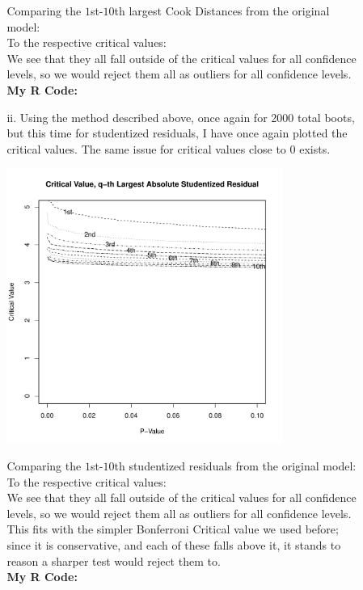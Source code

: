 \documentclass[11pt]{article}
\theoremstyle{definition}
\begin{document}
\begin{itemize}
\begin{itemize}
\begin{itemize}
                        Comparing the $1$st-$10$th largest Cook Distances from the original model:\\ 
                         
                        To the respective critical values: \\
                         
                        We see that they all fall outside of the critical values for all confidence levels, so we would reject them all as outliers for all confidence levels. \\
                        {\bf My R Code:}
                         

                    \item[ii.]
                        Using the method described above, once again for 2000 total boots, but this time for studentized residuals, I have once again plotted the critical values. The same issue for critical values close to 0 exists.
                        \begin{center}
                            \includegraphics[width=9cm]{final/2bii_plot} 
                        \end{center}
                        Comparing the $1$st-$10$th studentized residuals from the original model:\\ 
                         
                        To the respective critical values: \\
                         
                        We see that they all fall outside of the critical values for all confidence levels, so we would reject them all as outliers for all confidence levels. This fits with the simpler Bonferroni Critical value we used before; since it is conservative, and each of these falls above it, it stands to reason a sharper test would reject them to. \\
                        {\bf My R Code:}
                         


\end{itemize}
\end{itemize}
\end{itemize}
\end{document}
